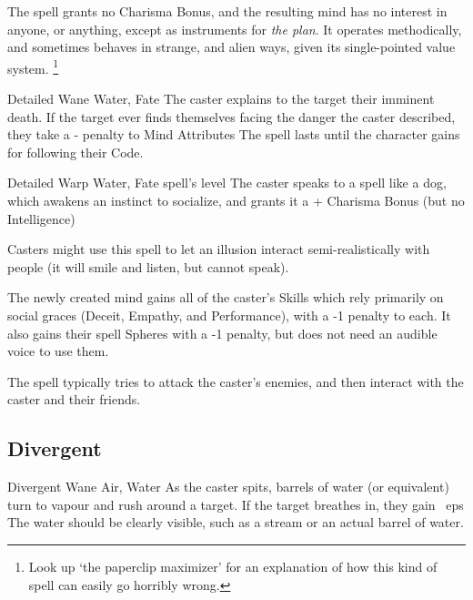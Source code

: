 \begin{multicols}{2}
{  The spell grants no Charisma Bonus, and the resulting mind has no interest in anyone, or anything, except as instruments for \emph{the plan}.
  It operates methodically, and sometimes behaves in strange, and alien ways, given its single-pointed value system.%
  \footnote{Look up `the paperclip maximizer' for an explanation of how this kind of spell can easily go horribly wrong.}
  }

\null
{}%
  {Detailed}%
  {Wane}%
  {Water, Fate}%
  {}%
  {The caster explains to the target their imminent death.
    If the target ever finds themselves facing the danger the caster described, they take a - penalty to Mind Attributes}%
  {The spell lasts until the character gains  for following their Code.}



\null
{}%
  {Detailed}%
  {Warp}%
  {Water, Fate}%
  {spell's level}%
  {The caster speaks to a spell like a dog, which awakens an instinct to socialize, and grants it a + Charisma Bonus (but no Intelligence)}%
  {
  Casters might use this spell to let an illusion interact semi-realistically with people (it will smile and listen, but cannot speak).

  The newly created mind gains all of the caster's Skills which rely primarily on social graces (Deceit, Empathy, and Performance), with a -1 penalty to each.
  It also gains their spell Spheres with a -1 penalty, but does not need an audible voice to use them.

  The spell typically tries to attack the caster's enemies, and then interact with the caster and their friends.

  }


\subsection{Divergent}

  {Divergent}%
  {Wane}%
  {Air, Water}%
  {}%
  {As the caster spits,  barrels of water (or equivalent) turn to vapour and rush around a target.
  If the target breathes in, they gain ~\glspl{ep}}%
  {
    The water should be clearly visible, such as a stream or an actual barrel of water.}


\end{multicols}
